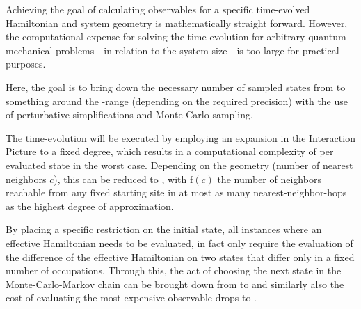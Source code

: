 Achieving the goal of calculating observables for a specific time-evolved Hamiltonian and system geometry is mathematically straight forward.
However, the computational expense for solving the time-evolution for arbitrary quantum-mechanical problems - in relation to the system size - is too large for practical purposes.

Here, the goal is to bring down the necessary number of sampled states from  to something around the -range (depending on the required precision) with the use of perturbative simplifications and Monte-Carlo sampling. 

The time-evolution will be executed by employing an expansion in the Interaction Picture to a fixed degree, which results in a computational complexity of  per evaluated state in the worst case.
Depending on the geometry (number of nearest neighbors $c$), this can be reduced to , with $\mathrm{f}(c)$ the number of neighbors reachable from any fixed starting site in at most as many nearest-neighbor-hops as the highest degree of approximation.

By placing a specific restriction on the initial state, all instances where an effective Hamiltonian needs to be evaluated, in fact only require the evaluation of the difference of the effective Hamiltonian on two states that differ only in a fixed number of occupations.
Through this, the act of choosing the next state in the Monte-Carlo-Markov chain can be brought down from  to  and similarly also the cost of evaluating the most expensive observable drops to .
